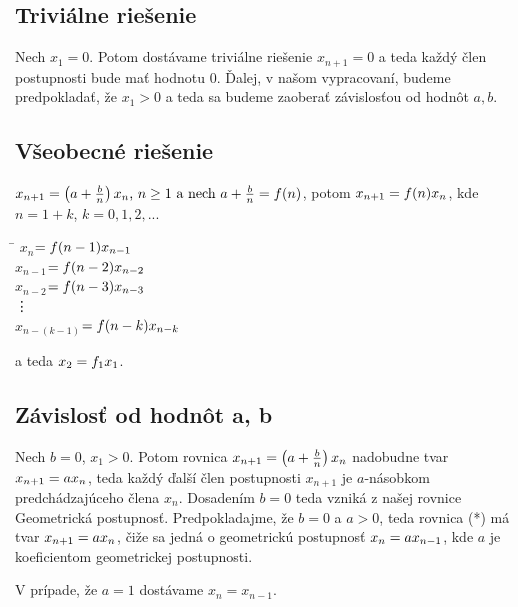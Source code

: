 \documentclass[a4paper,10pt]{article}
\theoremstyle{plain}
\theoremstyle{definition}
\begin{document}
\subsection{Triviálne riešenie}
Nech $x_{1}=0$.\newline
 Potom dostávame triviálne riešenie $x_{n+1} = 0$ a teda každý člen postupnosti bude mať hodnotu $0$. Ďalej, v našom vypracovaní, budeme predpokladať, že $ x_{1} > 0 $ a teda sa budeme 
zaoberať závislosťou od hodnôt $ a,b $.

\subsection{Všeobecné riešenie}
$x_{n+1}=\left(a+{\frac{b}{n}}\right)\*x_{n} \text{, } n \geq 1 \text{ a nech } a + {\frac{b}{n}} = f(n)$, potom
$x_{n+1}=f(n)\*x_{n}   $, kde $ n = 1 + k $, $ k = 0,1,2,... $
\begin{spacing}{1.3}
\begin{tabbing}
\hspace{1.5cm}\=\kill
$ x_{n}$\>$=f(n-1)\*x_{n-1}    $\\
$ x_{n-1}$\>$=f(n-2)\*x_{n-2}    $\\
$ x_{n-2}$\>$=f(n-3)\*x_{n-3}    $\\
\>\vdots \\
$ x_{n-(k-1)}$\>$=f(n-k)\*x_{n-k}    $
\end{tabbing} 
\end{spacing}
\noindent a teda $ x_{2} = f_{1}\*x_{1} $. 

\subsection{Závislosť od hodnôt a, b}
Nech $ b=0 $,  $x_{1}>0$.\newline
Potom rovnica $x_{n+1}=\left(a+{\frac{b}{n}}\right)\*x_{n}$  nadobudne tvar  $x_{n+1}= a\*x_{n}$, 
teda každý ďalší člen postupnosti $x_{n+1}$ je $a$-násobkom predchádzajúceho člena  $x_{n}$.
Dosadením  $b=0$ teda vzniká z našej rovnice Geometrická postupnosť.
\newpage
Predpokladajme, že $ b=0 $ a $ a > 0 $, teda rovnica (*) má tvar $ x_{n+1} = a\*x_{n} $, čiže sa jedná o geometrickú postupnosť
$ x_{n} = a\*x_{n-1} $, kde $ a $ je koeficientom geometrickej postupnosti. 

V prípade, že $ a = 1 $ dostávame $ x_{n} = x_{n-1} $.
\end{document}
